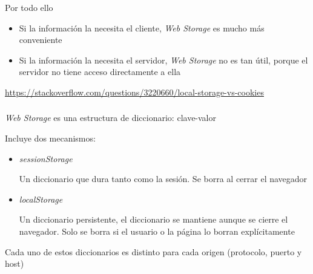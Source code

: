 \documentclass[ucs]{beamer}
\begin{document}
\begin{frame}[fragile]

Por todo ello

    \begin{itemize}
    \item
Si la información la necesita el cliente, 
\emph{Web Storage} 
es mucho más conveniente

    \item
Si la información la necesita el servidor, 
\emph{Web Storage} 
no es tan útil, porque
el servidor no tiene acceso directamente a ella
    \end{itemize}


\begin{tiny}
\begin{flushright}
\url{https://stackoverflow.com/questions/3220660/local-storage-vs-cookies}
\end{flushright}
\end{tiny}
\end{frame}

\begin{frame}[fragile]
\frametitle{}

\emph{Web Storage} 
es una estructura de diccionario: clave-valor


Incluye dos mecanismos:
\begin{itemize}
\item

\emph{sessionStorage}

Un diccionario que dura tanto como la sesión. Se borra al cerrar el navegador


\item
\emph{localStorage} 

Un diccionario persistente, el diccionario se mantiene aunque se cierre el navegador. Solo
se borra si el usuario o la página lo borran explícitamente

\end{itemize}

Cada uno de estos diccionarios es distinto para cada origen (protocolo, puerto y host)
\end{frame}
\end{document}
